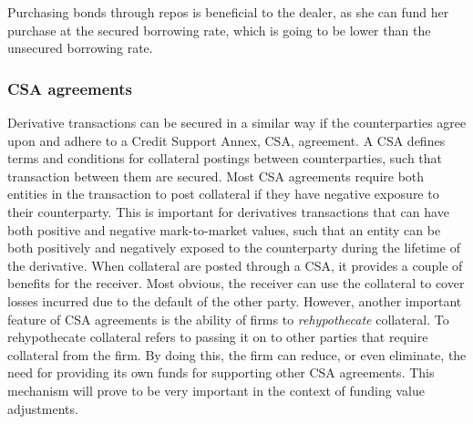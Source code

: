 \documentclass[main.tex]{subfiles}
\begin{document}
        Purchasing bonds through repos is beneficial to the dealer,
        as she can fund her purchase at the secured borrowing rate,
        which is going to be lower than the unsecured borrowing rate.

        \subsubsection{CSA agreements}
        Derivative transactions can be secured in a similar way 
        if the counterparties agree upon and adhere to a Credit Support Annex, CSA, agreement.
        A CSA defines terms and conditions for collateral postings between counterparties, 
        such that transaction between them are secured.
        Most CSA agreements require both entities in the transaction to post collateral 
        if they have negative exposure to their counterparty. 
        This is important for derivatives transactions that can have both 
        positive and negative mark-to-market values, 
        such that an entity can be both positively and negatively exposed to the counterparty
        during the lifetime of the derivative.
        When collateral are posted through a CSA, it provides a couple of benefits for the receiver.
        Most obvious, the receiver can use the collateral to cover losses incurred 
        due to the default of the other party.
        However, another important feature of CSA agreements is the ability of firms to
        \textit{rehypothecate} collateral.
        To rehypothecate collateral refers to passing it on to other parties that
        require collateral from the firm.
        By doing this, the firm can reduce, or even eliminate, the need for providing its own funds
        for supporting other CSA agreements. 
        This mechanism will prove to be very important in the context of funding value adjustments.
\end{document}
